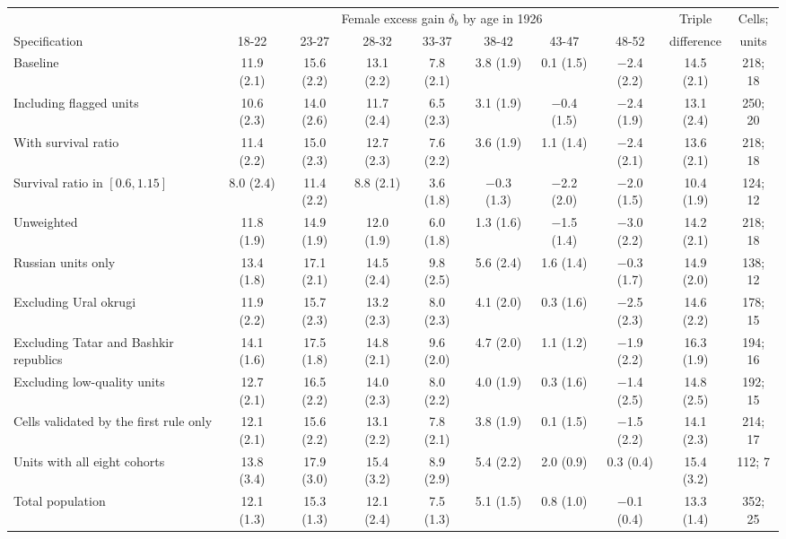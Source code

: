 \begin{tabular}{lccccccccc}
\toprule
 & \multicolumn{7}{c}{Female excess gain $\delta_b$ by age in 1926} & Triple & Cells; \\
\cmidrule(lr){2-8}
Specification & 18-22 & 23-27 & 28-32 & 33-37 & 38-42 & 43-47 & 48-52 & difference & units \\
\midrule
Baseline & 11.9 (2.1) & 15.6 (2.2) & 13.1 (2.2) & 7.8 (2.1) & 3.8 (1.9) & 0.1 (1.5) & $-$2.4 (2.2) & 14.5 (2.1) & 218; 18 \\
Including flagged units & 10.6 (2.3) & 14.0 (2.6) & 11.7 (2.4) & 6.5 (2.3) & 3.1 (1.9) & $-$0.4 (1.5) & $-$2.4 (1.9) & 13.1 (2.4) & 250; 20 \\
With survival ratio & 11.4 (2.2) & 15.0 (2.3) & 12.7 (2.3) & 7.6 (2.2) & 3.6 (1.9) & 1.1 (1.4) & $-$2.4 (2.1) & 13.6 (2.1) & 218; 18 \\
Survival ratio in $[0.6, 1.15]$ & 8.0 (2.4) & 11.4 (2.2) & 8.8 (2.1) & 3.6 (1.8) & $-$0.3 (1.3) & $-$2.2 (2.0) & $-$2.0 (1.5) & 10.4 (1.9) & 124; 12 \\
Unweighted & 11.8 (1.9) & 14.9 (1.9) & 12.0 (1.9) & 6.0 (1.8) & 1.3 (1.6) & $-$1.5 (1.4) & $-$3.0 (2.2) & 14.2 (2.1) & 218; 18 \\
Russian units only & 13.4 (1.8) & 17.1 (2.1) & 14.5 (2.4) & 9.8 (2.5) & 5.6 (2.4) & 1.6 (1.4) & $-$0.3 (1.7) & 14.9 (2.0) & 138; 12 \\
Excluding Ural okrugi & 11.9 (2.2) & 15.7 (2.3) & 13.2 (2.3) & 8.0 (2.3) & 4.1 (2.0) & 0.3 (1.6) & $-$2.5 (2.3) & 14.6 (2.2) & 178; 15 \\
Excluding Tatar and Bashkir republics & 14.1 (1.6) & 17.5 (1.8) & 14.8 (2.1) & 9.6 (2.0) & 4.7 (2.0) & 1.1 (1.2) & $-$1.9 (2.2) & 16.3 (1.9) & 194; 16 \\
Excluding low-quality units & 12.7 (2.1) & 16.5 (2.2) & 14.0 (2.3) & 8.0 (2.2) & 4.0 (1.9) & 0.3 (1.6) & $-$1.4 (2.5) & 14.8 (2.5) & 192; 15 \\
Cells validated by the first rule only & 12.1 (2.1) & 15.6 (2.2) & 13.1 (2.2) & 7.8 (2.1) & 3.8 (1.9) & 0.1 (1.5) & $-$1.5 (2.2) & 14.1 (2.3) & 214; 17 \\
Units with all eight cohorts & 13.8 (3.4) & 17.9 (3.0) & 15.4 (3.2) & 8.9 (2.9) & 5.4 (2.2) & 2.0 (0.9) & 0.3 (0.4) & 15.4 (3.2) & 112; 7 \\
Total population & 12.1 (1.3) & 15.3 (1.3) & 12.1 (2.4) & 7.5 (1.3) & 5.1 (1.5) & 0.8 (1.0) & $-$0.1 (0.4) & 13.3 (1.4) & 352; 25 \\
\bottomrule
\end{tabular}
